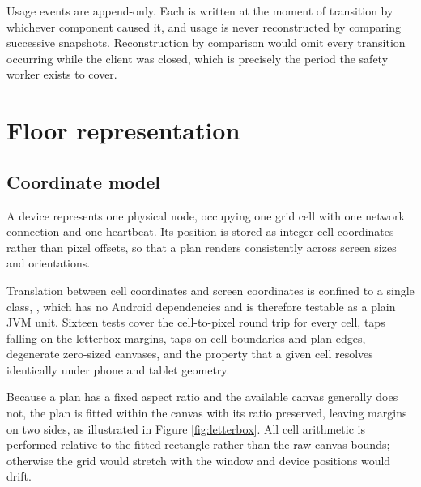 \documentclass[11pt,a4paper]{article}
\begin{document}
Usage events are append-only. Each is written at the moment of transition by
whichever component caused it, and usage is never reconstructed by comparing
successive snapshots. Reconstruction by comparison would omit every transition
occurring while the client was closed, which is precisely the period the safety
worker exists to cover.

\section{Floor representation}

\subsection{Coordinate model}

A device represents one physical node, occupying one grid cell with one network
connection and one heartbeat. Its position is stored as integer cell
coordinates rather than pixel offsets, so that a plan renders consistently
across screen sizes and orientations.

Translation between cell coordinates and screen coordinates is confined to a
single class, , which has no Android dependencies and is
therefore testable as a plain JVM unit. Sixteen tests cover the cell-to-pixel
round trip for every cell, taps falling on the letterbox margins, taps on cell
boundaries and plan edges, degenerate zero-sized canvases, and the property that
a given cell resolves identically under phone and tablet geometry.

Because a plan has a fixed aspect ratio and the available canvas generally does
not, the plan is fitted within the canvas with its ratio preserved, leaving
margins on two sides, as illustrated in Figure \ref{fig:letterbox}. All cell
arithmetic is performed relative to the fitted rectangle rather than the raw
canvas bounds; otherwise the grid would stretch with the window and device
positions would drift.
\end{document}
